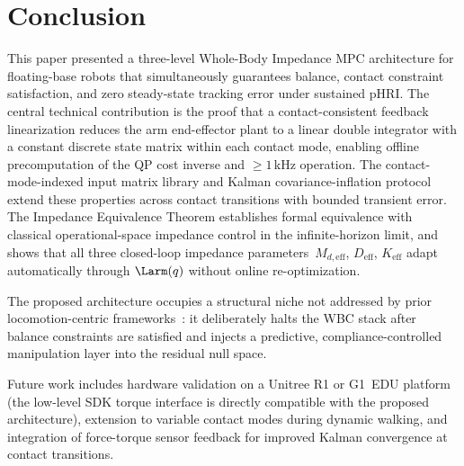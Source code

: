 \section{Conclusion}\label{sec:conclusion}

This paper presented a three-level Whole-Body Impedance MPC architecture
for floating-base robots that simultaneously guarantees balance, contact
constraint satisfaction, and zero steady-state tracking error under
sustained pHRI.
The central technical contribution is the proof that a contact-consistent
feedback linearization reduces the arm end-effector plant to a linear double
integrator with a constant discrete state matrix within each contact mode,
enabling offline precomputation of the QP cost inverse and ${\geq}1$\,kHz
operation.
The contact-mode-indexed input matrix library and Kalman covariance-inflation
protocol extend these properties across contact transitions with bounded
transient error.
The Impedance Equivalence Theorem establishes formal equivalence with
classical operational-space impedance control in the infinite-horizon limit,
and shows that all three closed-loop impedance parameters~$M_{d,\text{eff}}$,
$D_{\text{eff}}$, $K_{\text{eff}}$ adapt automatically through
$\Larm(q)$ without online re-optimization.

The proposed architecture occupies a structural niche not addressed by prior
locomotion-centric frameworks~\cite{dicarlo2018dynamic,kim2019highly,bellicoso2016perception,koolen2016design}:
it deliberately halts the WBC stack after balance constraints are satisfied
and injects a predictive, compliance-controlled manipulation layer into the
residual null space.

Future work includes hardware validation on a Unitree R1 or G1~EDU platform
(the low-level SDK torque interface is directly compatible with the proposed
architecture), extension to variable contact modes during dynamic walking,
and integration of force-torque sensor feedback for improved Kalman
convergence at contact transitions.



